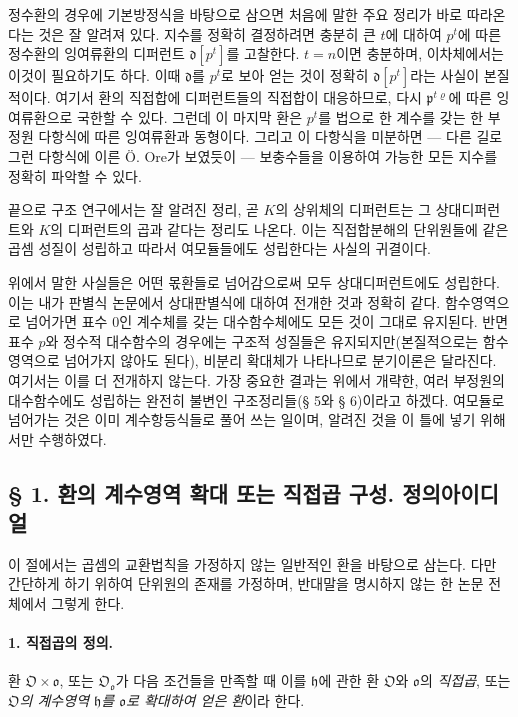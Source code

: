 정수환의 경우에 기본방정식을 바탕으로 삼으면 처음에 말한 주요 정리가 바로 따라온다는 것은 잘 알려져 있다. 지수를 정확히 결정하려면 충분히 큰 \(t\)에 대하여 \(p^t\)에 따른 정수환의 잉여류환의 디퍼런트 \(\mathfrak d[p^t]\)를 고찰한다. \(t=n\)이면 충분하며, 이차체에서는 이것이 필요하기도 하다. 이때 \(\mathfrak d\)를 \(p^t\)로 보아 얻는 것이 정확히 \(\mathfrak d[p^t]\)라는 사실이 본질적이다. 여기서 환의 직접합에 디퍼런트들의 직접합이 대응하므로, 다시 \(\mathfrak p^{t\varrho}\)에 따른 잉여류환으로 국한할 수 있다. 그런데 이 마지막 환은 \(p^t\)를 법으로 한 계수를 갖는 한 부정원 다항식에 따른 잉여류환과 동형이다. 그리고 이 다항식을 미분하면 --- 다른 길로 그런 다항식에 이른 Ö. Ore가 보였듯이 --- 보충수들을 이용하여 가능한 모든 지수를 정확히 파악할 수 있다.

끝으로 구조 연구에서는 잘 알려진 정리, 곧 \(K\)의 상위체의 디퍼런트는 그 상대디퍼런트와 \(K\)의 디퍼런트의 곱과 같다는 정리도 나온다. 이는 직접합분해의 단위원들에 같은 곱셈 성질이 성립하고 따라서 여모듈들에도 성립한다는 사실의 귀결이다.

위에서 말한 사실들은 어떤 몫환들로 넘어감으로써 모두 상대디퍼런트에도 성립한다. 이는 내가 판별식 논문에서 상대판별식에 대하여 전개한 것과 정확히 같다. 함수영역으로 넘어가면 표수 0인 계수체를 갖는 대수함수체에도 모든 것이 그대로 유지된다. 반면 표수 \(p\)와 정수적 대수함수의 경우에는 구조적 성질들은 유지되지만(본질적으로는 함수영역으로 넘어가지 않아도 된다), 비분리 확대체가 나타나므로 분기이론은 달라진다. 여기서는 이를 더 전개하지 않는다. 가장 중요한 결과는 위에서 개략한, 여러 부정원의 대수함수에도 성립하는 완전히 불변인 구조정리들(§ 5와 § 6)이라고 하겠다. 여모듈로 넘어가는 것은 이미 계수항등식들로 풀어 쓰는 일이며, 알려진 것을 이 틀에 넣기 위해서만 수행하였다.

\subsection*{§ 1. 환의 계수영역 확대 또는 직접곱 구성. 정의아이디얼}

이 절에서는 곱셈의 교환법칙을 가정하지 않는 일반적인 환을 바탕으로 삼는다. 다만 간단하게 하기 위하여 단위원의 존재를 가정하며, 반대말을 명시하지 않는 한 논문 전체에서 그렇게 한다.

\paragraph{1. 직접곱의 정의.}
환 \(\mathfrak O\times\mathfrak o\), 또는 \(\mathfrak O_{\mathfrak o}\)가 다음 조건들을 만족할 때 이를 \(\mathfrak h\)에 관한 환 \(\mathfrak O\)와 \(\mathfrak o\)의 \emph{직접곱}, 또는 \emph{\(\mathfrak O\)의 계수영역 \(\mathfrak h\)를 \(\mathfrak o\)로 확대하여 얻은 환}이라 한다.


